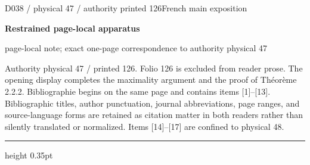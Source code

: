 \documentclass[9pt]{article}
\newcommand{\CanonText}[1]{\par{\fontsize{8.0}{9.35}\selectfont\RaggedRight #1\par}\vspace{2.2pt}}
\newcommand{\LayerTitle}{Restrained page-local apparatus}
\begin{document}
\noindent\begin{minipage}[t][\dimexpr\textheight-5pt\relax][t]{\textwidth}
{\sffamily\fontsize{7.3}{8.2}\selectfont\color{Quiet} D038 / physical 47 / authority printed 126\hfill French main exposition}
\par{}\vspace{4.5pt}
{\sffamily\fontsize{10.4}{11.6}\selectfont\bfseries\color{Accent} \LayerTitle}
\par{\sffamily\fontsize{6.7}{7.7}\selectfont\color{Quiet} page-local note; exact one-page correspondence to authority physical 47}
\vspace{5pt}
\CanonText{Authority physical 47 / printed 126. Folio 126 is excluded from reader prose. The opening display completes the maximality argument and the proof of Théorème 2.2.2. Bibliographie begins on the same page and contains items [1]–[13]. Bibliographic titles, author punctuation, journal abbreviations, page ranges, and source-language forms are retained as citation matter in both readers rather than silently translated or normalized. Items [14]–[17] are confined to physical 48.}
\vfill
{\color{Accent}\hrule height 0.35pt}\vspace{3pt}
\end{minipage}
\newpage
\end{document}
